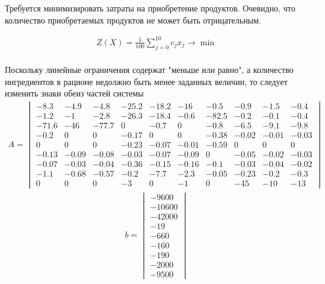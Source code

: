 \documentclass[a4paper, 12pt]{article}
\begin{document}
Требуется минимизировать затраты на приобретение продуктов. Очевидно, что количество приобретаемых продуктов не может быть отрицательным.

\begin{align*}
  Z(X) = \frac{1}{100}\sum_{j=0}^{10} c_jx_j \rightarrow \min
\end{align*}\\

Поскольку линейные ограничения содержат "меньше или равно", а количество ингредиентов в рационе недолжно быть менее заданных величин, то следует изменить знаки обеиз частей системы\\
\begin{align*}
  A=\begin{vmatrix}
    -8.3 & -4.9 & -4.8 & -25.2 & -18.2 & -16 & -0.5 & -0.9 & -1.5 & -0.4 \\
    -1.2 & -1 & -2.8 & -26.3 & -18.4 & -0.6 & -82.5 & -0.2 & -0.1 & -0.4 \\
    -71.6 & -46 & -77.7 & 0 & -0.7 & 0 & -0.8 & -6.5 & -9.1 & -9.8 \\
    -0.2 &  0 & 0 & -0.17 & 0 & 0 & -0.38 & -0.02 & -0.01 & -0.03 \\
    0 & 0 & 0 &-0.23 & -0.07 & -0.01 & -0.59 & 0 & 0 & 0 \\
    -0.13 & -0.09 & -0.08 & -0.03& -0.07 & -0.09 & 0 & -0.05 & -0.02 & -0.03 \\
    -0.07 & -0.03 & -0.04 & -0.36 & -0.15 & -0.16 & -0.1 & -0.03 & -0.04 & -0.02 \\
    -1.1 & -0.68 & -0.57 & -0.2 & -7.7 & -2.3 & -0.05 & -0.23 & -0.2 & -0.3 \\
    0 & 0 & 0 & -3 & 0 & -1 & 0 & -45 & -10 & -13 
\end{vmatrix}
\end{align*}
\begin{align*}
  b=\begin{vmatrix}
    -9600 \\ -10600 \\ -42000 \\ -19 \\ -660 \\ -160 \\ -190 \\ -2000 \\ -9500
  \end{vmatrix}
\end{align*}
\end{document}

